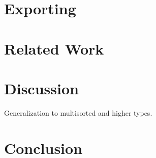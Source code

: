 \documentclass[]{article}
\begin{document}
\section{Exporting}

\section{Related Work}

\section{Discussion}
Generalization to multisorted and higher types. 

\section{Conclusion}

    
\end{document}
